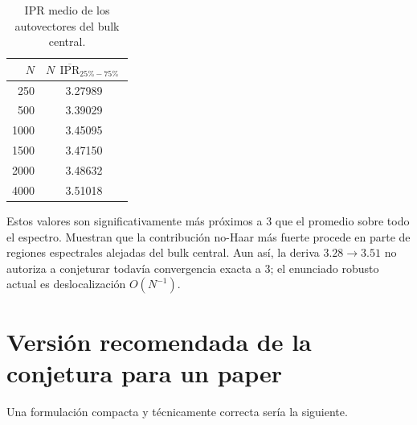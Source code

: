 \documentclass[11pt,a4paper]{article}
\newcommand{\IPR}{\operatorname{IPR}}
\begin{document}
\begin{table}[htbp]
\centering
\caption{IPR medio de los autovectores del bulk central.}
\label{tab:ipr-central}
\begin{tabular}{rc}
\toprule
$N$ & $N\,\overline{\IPR}_{25\%-75\%}$\\
\midrule
250  & 3.27989\\
500  & 3.39029\\
1000 & 3.45095\\
1500 & 3.47150\\
2000 & 3.48632\\
4000 & 3.51018\\
\bottomrule
\end{tabular}
\end{table}

Estos valores son significativamente más próximos a $3$ que el promedio sobre todo el espectro. Muestran que la contribución no-Haar más fuerte procede en parte de regiones espectrales alejadas del bulk central. Aun así, la deriva $3.28\to3.51$ no autoriza a conjeturar todavía convergencia exacta a $3$; el enunciado robusto actual es deslocalización $O(N^{-1})$.

\section{Versión recomendada de la conjetura para un paper}

Una formulación compacta y técnicamente correcta sería la siguiente.
\end{document}
